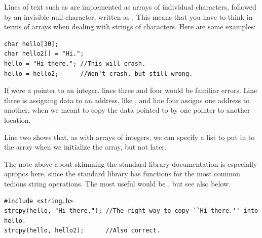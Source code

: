 Lines of text such as  are implemented as arrays of
individual characters, followed by an invisible null character, written
as . This means that you have to think in terms of
arrays when dealing with strings of characters. Here are some examples: 
\lstset{numbers=left, numberstyle=\scshape}
\begin{lstlisting}
char hello[30];
char hello2[] = "Hi.";
hello = "Hi there."; //This will crash.
hello = hello2;      //Won't crash, but still wrong.
\end{lstlisting}
\lstset{numbers=none}

If  were a pointer to an integer, lines three and four
would be familiar errors. Line three is assigning data to an address,
like , and line four assigns one address to another,
when we meant to copy the data pointed to by one pointer to another
location.

Line two shows that, as with arrays of integers, we can specify a list
to put in to the array when we initialize the array, but not later.

The note above about skimming the standard library documentation is
especially apropos here, since the standard library has functions for
the most common tedious string operations. The
most useful would be , but see also  below.
\begin{lstlisting}
#include <string.h>
strcpy(hello, "Hi there."); //The right way to copy ``Hi there.'' into hello.
strcpy(hello, hello2);      //Also correct.
\end{lstlisting}

